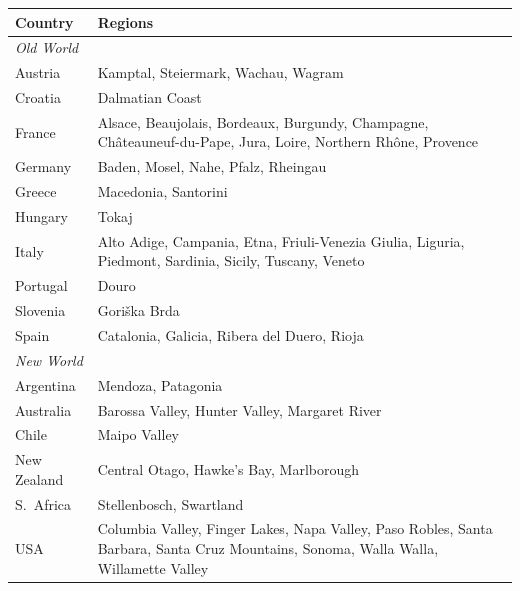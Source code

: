\documentclass[11pt]{article}
\begin{document}
\begin{center}
\begin{tabular}{@{}lp{10cm}@{}}
\toprule
Country & Regions \\
\midrule
\multicolumn{2}{l}{\textit{Old World}} \\
Austria   & Kamptal, Steiermark, Wachau, Wagram \\
Croatia   & Dalmatian Coast \\
France    & Alsace, Beaujolais, Bordeaux, Burgundy, Champagne, Ch\^ateauneuf-du-Pape, Jura, Loire, Northern Rh\^one, Provence \\
Germany   & Baden, Mosel, Nahe, Pfalz, Rheingau \\
Greece    & Macedonia, Santorini \\
Hungary   & Tokaj \\
Italy     & Alto Adige, Campania, Etna, Friuli-Venezia Giulia, Liguria, Piedmont, Sardinia, Sicily, Tuscany, Veneto \\
Portugal  & Douro \\
Slovenia  & Gori\v{s}ka Brda \\
Spain     & Catalonia, Galicia, Ribera del Duero, Rioja \\
\midrule
\multicolumn{2}{l}{\textit{New World}} \\
Argentina   & Mendoza, Patagonia \\
Australia   & Barossa Valley, Hunter Valley, Margaret River \\
Chile       & Maipo Valley \\
New Zealand & Central Otago, Hawke's Bay, Marlborough \\
S.\ Africa  & Stellenbosch, Swartland \\
USA         & Columbia Valley, Finger Lakes, Napa Valley, Paso Robles, Santa Barbara, Santa Cruz Mountains, Sonoma, Walla Walla, Willamette Valley \\
\bottomrule
\end{tabular}
\end{center}
\end{document}
